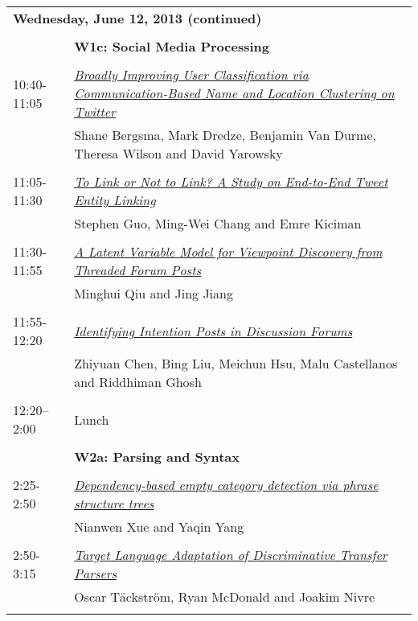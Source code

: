 \newpage
\begin{tabular}{p{20mm}p{138mm}}
\\
\multicolumn{2}{l}{\bf Wednesday, June 12, 2013
 (continued)} \\\\
 & {\bf W1c: Social Media Processing
} \\
\\
10:40-11:05 & \hyperlink{page.1010}{\em Broadly Improving User Classification via Communication-Based Name and Location Clustering on Twitter}\\
         & Shane Bergsma, Mark Dredze, Benjamin Van Durme, Theresa Wilson and David Yarowsky \\
\\

11:05-11:30 & \hyperlink{page.1020}{\em To Link or Not to Link? A Study on End-to-End Tweet Entity Linking}\\
         & Stephen Guo, Ming-Wei Chang and Emre Kiciman \\
\\

11:30-11:55 & \hyperlink{page.1031}{\em A Latent Variable Model for Viewpoint Discovery from Threaded Forum Posts}\\
         & Minghui Qiu and Jing Jiang \\
\\

11:55-12:20 & \hyperlink{page.1041}{\em Identifying Intention Posts in Discussion Forums}\\
         & Zhiyuan Chen, Bing Liu, Meichun Hsu, Malu Castellanos and Riddhiman Ghosh \\
\\

12:20--2:00 & Lunch
 \\
\\
 & {\bf W2a: Parsing and Syntax
} \\
\\
2:25-2:50 & \hyperlink{page.1051}{\em Dependency-based empty category detection via phrase structure trees}\\
         & Nianwen Xue and Yaqin Yang \\
\\

2:50-3:15 & \hyperlink{page.1061}{\em Target Language Adaptation of Discriminative Transfer Parsers}\\
         & Oscar T\"{a}ckstr\"{o}m, Ryan McDonald and Joakim Nivre \\
\\


\end{tabular}
